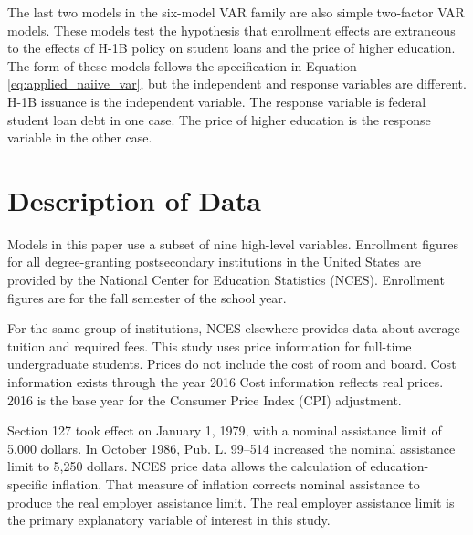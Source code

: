 \documentclass[review]{elsarticle}
\begin{document}
The last two models in the six-model VAR family are also simple two-factor VAR models.
These models test the hypothesis that enrollment effects are extraneous
to the effects of H-1B policy on student loans and the price of higher education.
The form of these models follows the specification in Equation \ref{eq:applied_naiive_var},
but the independent and response variables are different.
H-1B issuance is the independent variable.
The response variable is federal student loan debt in one case.
The price of higher education is the response variable in the other case.

\section{Description of Data}

Models in this paper use a subset of nine high-level variables.
Enrollment figures for all degree-granting postsecondary institutions in the United States
are provided by the National Center for Education Statistics (NCES)\cite{nces_2019}.
Enrollment figures are for the fall semester of the school year.

For the same group of institutions,
NCES elsewhere provides data about average tuition and required fees\cite{nces_2017}.
This study uses price information for full-time undergraduate students.
Prices do not include the cost of room and board.
Cost information exists through the year 2016
Cost information reflects real prices.
2016 is the base year for the Consumer Price Index (CPI) adjustment.

Section 127 took effect on January 1, 1979, with a nominal assistance limit of 5,000 dollars\cite{plaw95_600_1978}.
In October 1986, Pub. L. 99–514 increased the nominal assistance limit to 5,250 dollars\cite{plaw99_514_1986}.
NCES price data allows the calculation of education-specific inflation.
That measure of inflation corrects nominal assistance to produce the real employer assistance limit.
The real employer assistance limit is the primary explanatory variable of interest in this study.
\end{document}
